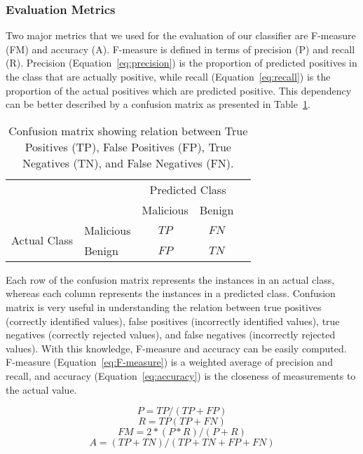 \documentclass[conference]{IEEEtran}
\begin{document}
\subsubsection{Evaluation Metrics}
Two major metrics that we used for the evaluation of our classifier are F-measure (FM) and accuracy (A). F-measure is defined in terms of precision (P) and recall (R). Precision (Equation~\ref{eq:precision}) is the proportion of predicted positives in the class that are actually positive, while recall (Equation~\ref{eq:recall}) is the proportion of the actual positives which are predicted positive. This dependency can be better described by a confusion matrix as presented in Table~\ref{confusionMatrix}. 
\begin{table}[h]
\small
\begin{center}
\begin{tabular}{l|l|c|c|c}
\multicolumn{2}{c}{}&\multicolumn{2}{c}{Predicted Class}&\\
\cline{3-4}
\multicolumn{2}{c|}{}&Malicious&Benign\\
\cline{2-4}
\multirow{2}{*}{Actual Class}& Malicious & $TP$ & $FN$\\
\cline{2-4}
& Benign & $FP$ & $TN$\\
\cline{2-4}
\end{tabular}
\caption{\label{confusionMatrix} Confusion matrix showing relation between True Positives (TP), False Positives (FP), True Negatives (TN), and False Negatives (FN).}
\end{center}
\end{table}
Each row of the confusion matrix represents the instances in an actual class, whereas each column represents the instances in a predicted class. Confusion matrix is very useful in understanding the relation between true positives (correctly identified values), false positives (incorrectly identified values), true negatives (correctly rejected values), and false negatives (incorrectly rejected values). With this knowledge, F-measure and accuracy can be easily computed. F-measure (Equation~\ref{eq:F-measure}) is a weighted average of precision and recall, and accuracy (Equation~\ref{eq:accuracy}) is the closeness of measurements to the actual value. 

\begin{equation}\label{eq:precision}
P = TP/(TP+FP) 
\end{equation}
\vspace{-3ex} 
\begin{equation}\label{eq:recall}
R = TP(TP+FN)
\end{equation}
\vspace{-3ex} 
\begin{equation}\label{eq:F-measure}
FM = 2*(P*R)/(P+R)
\end{equation}
\vspace{-3ex} 
\begin{equation}\label{eq:accuracy}
A = (TP+TN)/(TP+TN+FP+FN)
\end{equation}
\end{document}
